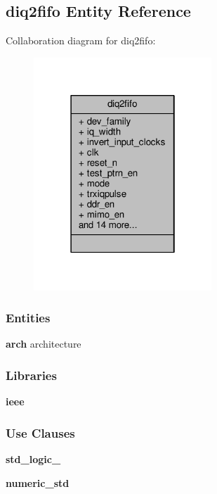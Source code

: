 \subsection{diq2fifo Entity Reference}
\label{classdiq2fifo}


Collaboration diagram for diq2fifo\+:\nopagebreak
\begin{figure}[H]
\begin{center}
\leavevmode
\includegraphics[width=190pt]{d9/db3/classdiq2fifo__coll__graph}
\end{center}
\end{figure}
\subsubsection*{Entities}
\begin{DoxyCompactItemize}
\item 
{\bf arch} architecture
\end{DoxyCompactItemize}
\subsubsection*{Libraries}
 \begin{DoxyCompactItemize}
\item 
{\bf ieee} 
\end{DoxyCompactItemize}
\subsubsection*{Use Clauses}
 \begin{DoxyCompactItemize}
\item 
{\bf std\+\_\+logic\+\_}   
\item 
{\bf numeric\+\_\+std}   
\end{DoxyCompactItemize}
